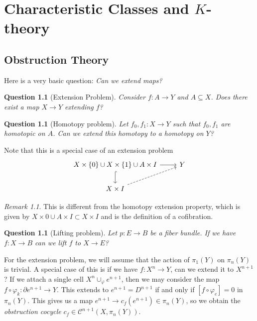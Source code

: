 \documentclass[leqno, openany]{memoir}
\newtheorem{quest}[thm]{Question}
\theoremstyle{definition}
\theoremstyle{remark}
\newtheorem{rmk}[thm]{Remark}
\theoremstyle{plain}
\theoremstyle{definition}
\theoremstyle{remark}
\newcommand{\mc}[1]{\mathcal{#1}}
\begin{document}
\chapter{Characteristic Classes and $K$-theory}%
\label{cha:characteristic_classes_and_k_theory}

\section{Obstruction Theory}%

Here is a very basic question: \textit{Can we extend maps?}

\begin{quest}[Extension Problem] Consider $f \colon A \to Y$ and $A \subseteq
X$. Does there exist a map $X \to Y$ extending $f$?  \end{quest}

\begin{quest}[Homotopy problem] Let $f_0, f_1 \colon X \to Y$ such that $f_0,
f_1$ are homotopic on $A$. Can we extend this homotopy to a homotopy on $Y$?
\end{quest}

Note that this is a special case of an extension problem \begin{equation*}
    \begin{tikzcd} X \times \qty{0} \cup X \times \qty{1} \cup A \times I
    \ar{r} \ar[hookrightarrow]{d} & Y \\ X \times I \ar[dashrightarrow]{ur}
\end{tikzcd} \end{equation*}

\begin{rmk} This is different from the homotopy extension property, which is
given by $X \times \qty{0} \cup A \times I \subset X \times I$ and is the
definition of a cofibration.  \end{rmk}

\begin{quest}[Lifting problem] Let $p \colon E \to B$ be a fiber bundle. If we
have $f \colon X \to B$ can we lift $f$ to $X \to E$?  \end{quest}

For the extension problem, we will assume that the action of $\pi_1(Y)$ on
$\pi_n(Y)$ is trivial. A special case of this is if we have $f \colon X^n \to
Y$, can we extend it to $X^{n+1}$? If we attach a single cell $X^n
\cup_{\varphi} e^{n+1}$, then we may consider the map $f \circ \varphi_k \colon
\partial e^{n+1} \to Y$. This extends to $e^{n+1} = D^{n+1}$ if and only if $[f
\circ \varphi_e] = 0$ in $\pi_n(Y)$. This gives us a map $e^{n+1} \to c_f
(e^{n+1}) \in \pi_n(Y)$, so we obtain the \textit{obstruction cocycle} $c_f \in
\mc{C}^{n+1}(X, \pi_n(Y))$.
\end{document}
